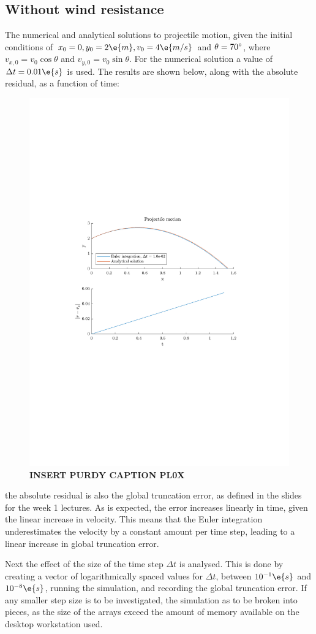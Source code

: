 \documentclass[a4paper,10pt]{article} 	%
\numberwithin{equation}{section}
\begin{document}
	\subsection{Without wind resistance}
	The numerical and analytical solutions to projectile motion, given the initial conditions of $ x_0 = 0,y_0 = 2 \e{m},v_0 = 4 \e{m/s}$ and $ \theta = 70\degree$, where $ v_{x,0} = v_0 \cos \theta $ and $ v_{y,0} = v_0 \sin \theta $. For the numerical solution a value of $ \Delta t = 0.01 \e{s}$ is used. The results are shown below, along with the absolute residual, as a function of time:
	\begin{figure}[H]
		\centering
		\includegraphics[width=0.7\linewidth]{projectile.pdf}
		\caption{\textbf{INSERT PURDY CAPTION PL0X}}
		\label{fig:projectile}
	\end{figure}
	the absolute residual is also the global truncation error, as defined in the slides for the week 1 lectures. As is expected, the error increases linearly in time, given the linear increase in velocity. This means that the Euler integration underestimates the velocity by a constant amount per time step, leading to a linear increase in global truncation error.
	
	
	Next the effect of the size of the time step $ \Delta t $ is analysed. This is done by creating a vector of logarithmically spaced values for $ \Delta t $, between $ 10^{-1} \e{s} $ and $ 10^{-8} \e{s}$, running the simulation, and recording the global truncation error. If any smaller step size is to be investigated, the simulation as to be broken into pieces, as the size of the arrays exceed the amount of memory available on the desktop workstation used.
	
\end{document}
